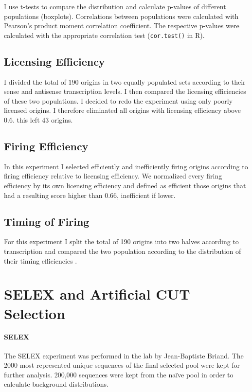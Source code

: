I use t-tests to compare the distribution and calculate p-values of different populations (boxplots). Correlations between populations were calculated with Pearson’s product moment correlation coefficient. The respective p-values were calculated with the appropriate correlation test (\texttt{cor.test()} in R).

\subsection*{Licensing Efficiency}
I divided the total of 190 origins in two equally populated sets according to their sense and antisense transcription levels. I then compared the licensing efficiencies of these two populations.
I decided to redo the experiment using only poorly licensed origins. I therefore eliminated all origins with licensing efficiency above 0.6. this left 43 origins.

\subsection*{Firing Efficiency}

In this experiment I selected efficiently and inefficiently firing origins according to firing efficiency relative to licensing efficiency. We normalized every firing efficiency by its own licensing efficiency and defined as efficient those origins that had a resulting score higher than 0.66, inefficient if lower.

\subsection*{Timing of Firing}

For this experiment I split the total of 190 origins into two halves according to transcription and compared the two population according to the distribution of their timing efficiencies .

\section*{SELEX and Artificial CUT Selection}

\paragraph{SELEX}
The SELEX experiment was performed in the lab by Jean-Baptiste Briand.
The 2000 most represented unique sequences of the final selected pool were kept for further analysis.
200,000 sequences were kept from the na\"{i}ve pool in order to calculate background distributions.


